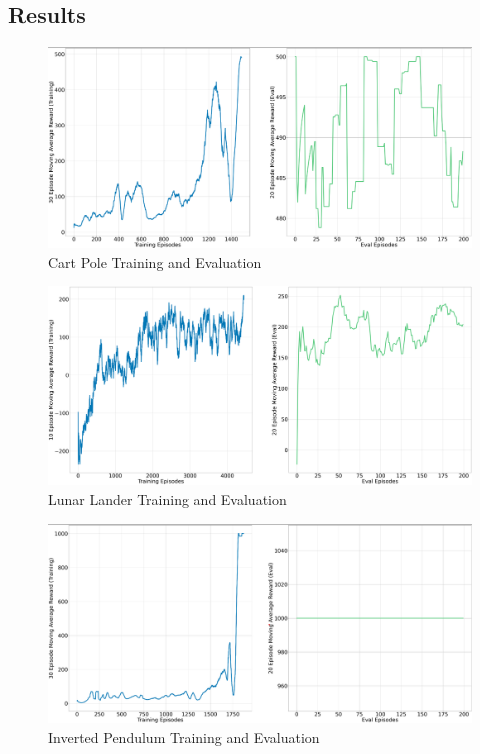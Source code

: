 \documentclass{article} %
\begin{document}
\subsection{Results}
\begin{figure}[H]
    \begin{center}
        \includegraphics[width=\textwidth]{a2c_cartpole.png}
    \end{center}
    \caption{Cart Pole Training and Evaluation}
\end{figure}

\begin{figure}[H]
    \begin{center}
        \includegraphics[width=\textwidth]{a2c_lunar.png}
    \end{center}
    \caption{Lunar Lander Training and Evaluation}
\end{figure}

\begin{figure}[H]
    \begin{center}
        \includegraphics[width=\textwidth]{a2c_invpendulum.png}
    \end{center}
    \caption{Inverted Pendulum Training and Evaluation}
\end{figure}
\end{document}
